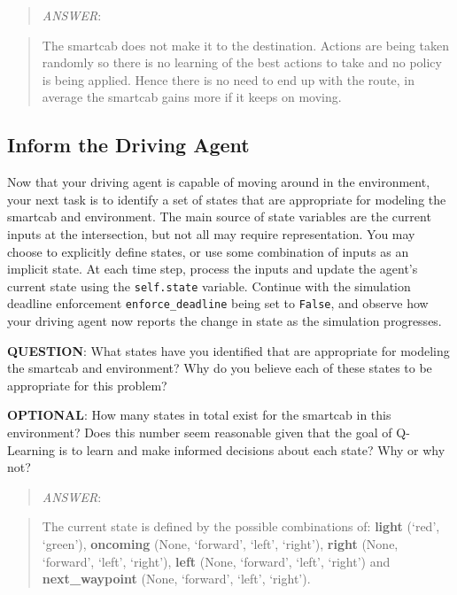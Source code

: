 \documentclass[11pt]{article}
\begin{document}
    \begin{quote}
\emph{ANSWER}:
\end{quote}

\begin{quote}
The smartcab does not make it to the destination. Actions are being
taken randomly so there is no learning of the best actions to take and
no policy is being applied. Hence there is no need to end up with the
route, in average the smartcab gains more if it keeps on moving.
\end{quote}

    \subsection{Inform the Driving Agent}\label{inform-the-driving-agent}

Now that your driving agent is capable of moving around in the
environment, your next task is to identify a set of states that are
appropriate for modeling the smartcab and environment. The main source
of state variables are the current inputs at the intersection, but not
all may require representation. You may choose to explicitly define
states, or use some combination of inputs as an implicit state. At each
time step, process the inputs and update the agent's current state using
the \texttt{self.state} variable. Continue with the simulation deadline
enforcement \texttt{enforce\_deadline} being set to \texttt{False}, and
observe how your driving agent now reports the change in state as the
simulation progresses.

\textbf{QUESTION}: What states have you identified that are appropriate
for modeling the smartcab and environment? Why do you believe each of
these states to be appropriate for this problem?

\textbf{OPTIONAL}: How many states in total exist for the smartcab in
this environment? Does this number seem reasonable given that the goal
of Q-Learning is to learn and make informed decisions about each state?
Why or why not?

    \begin{quote}
\emph{ANSWER}:
\end{quote}

\begin{quote}
The current state is defined by the possible combinations of:
\textbf{light} (`red', `green'), \textbf{oncoming} (None, `forward',
`left', `right'), \textbf{right} (None, `forward', `left', `right'),
\textbf{left} (None, `forward', `left', `right') and
\textbf{next\_waypoint} (None, `forward', `left', `right').
\end{quote}
\end{document}
